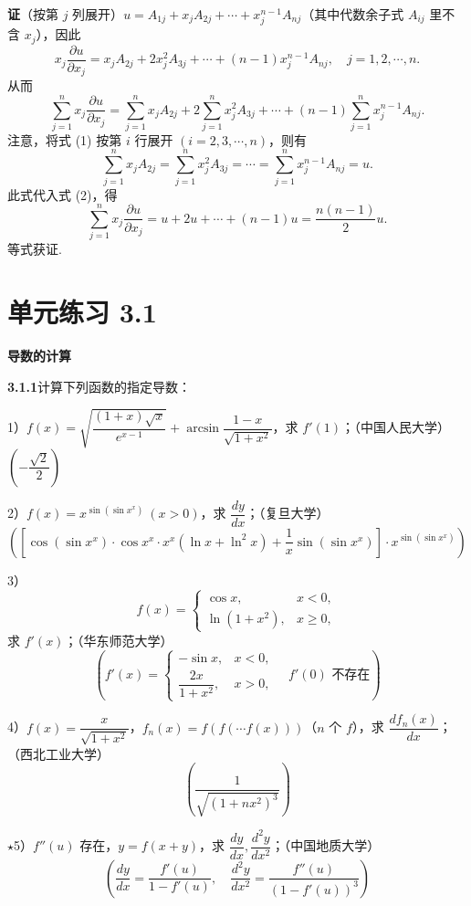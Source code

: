 \documentclass[UTF8, 12pt, fontset=fandol, oneside]{ctexart}
\begin{document}
\noindent\textbf{证}\quad （按第 $j$ 列展开）$u=A_{1j}+x_jA_{2j}+\cdots+x_j^{n-1}A_{nj}$（其中代数余子式 $A_{ij}$ 里不含 $x_j$），因此
\[
  x_j\frac{\partial u}{\partial x_j}
  =x_jA_{2j}+2x_j^2A_{3j}+\cdots+(n-1)x_j^{n-1}A_{nj},\quad j=1,2,\cdots,n.
\]
从而
\begin{equation}
  \sum_{j=1}^n x_j\frac{\partial u}{\partial x_j}
  =\sum_{j=1}^n x_jA_{2j}
  +2\sum_{j=1}^n x_j^2A_{3j}
  +\cdots+(n-1)\sum_{j=1}^n x_j^{n-1}A_{nj}.
\tag{2}
\end{equation}
注意，将式 (1) 按第 $i$ 行展开 $(i=2,3,\cdots,n)$，则有
\[
  \sum_{j=1}^n x_jA_{2j}
  =\sum_{j=1}^n x_j^2A_{3j}
  =\cdots=\sum_{j=1}^n x_j^{n-1}A_{nj}=u.
\]
此式代入式 (2)，得
\[
  \sum_{j=1}^n x_j\frac{\partial u}{\partial x_j}
  =u+2u+\cdots+(n-1)u=\frac{n(n-1)}2u.
\]
等式获证.

\section*{单元练习 3.1}

\noindent\textbf{导数的计算}

\noindent\textbf{3.1.1}\quad 计算下列函数的指定导数：

1）$f(x)=\sqrt{\dfrac{(1+x)\sqrt{x}}{e^{x-1}}}+\arcsin\dfrac{1-x}{\sqrt{1+x^2}}$，求 $f'(1)$；（中国人民大学）\quad $\left(-\dfrac{\sqrt2}{2}\right)$

2）$f(x)=x^{\sin(\sin x^x)}\ (x>0)$，求 $\dfrac{dy}{dx}$；（复旦大学）
\[
  \left(\left[\cos(\sin x^x)\cdot\cos x^x\cdot x^x(\ln x+\ln^2x)
  +\frac1x\sin(\sin x^x)\right]\cdot x^{\sin(\sin x^x)}\right)
\]

3）
\[
f(x)=
\begin{cases}
\cos x, & x<0,\\
\ln(1+x^2), & x\ge0,
\end{cases}
\]
求 $f'(x)$；（华东师范大学）
\[
\left(f'(x)=
\begin{cases}
-\sin x, & x<0,\\
\dfrac{2x}{1+x^2}, & x>0,
\end{cases}
\quad f'(0)\text{ 不存在}\right)
\]

4）$f(x)=\dfrac{x}{\sqrt{1+x^2}}$，$f_n(x)=f(f(\cdots f(x)))$（$n$ 个 $f$），求 $\dfrac{df_n(x)}{dx}$；（西北工业大学）
\[
  \left(\frac1{\sqrt{(1+nx^2)^3}}\right)
\]

$\star$5）$f''(u)$ 存在，$y=f(x+y)$，求 $\dfrac{dy}{dx},\dfrac{d^2y}{dx^2}$；（中国地质大学）
\[
  \left(\frac{dy}{dx}=\frac{f'(u)}{1-f'(u)},\quad
  \frac{d^2y}{dx^2}=\frac{f''(u)}{(1-f'(u))^3}\right)
\]
\end{document}
